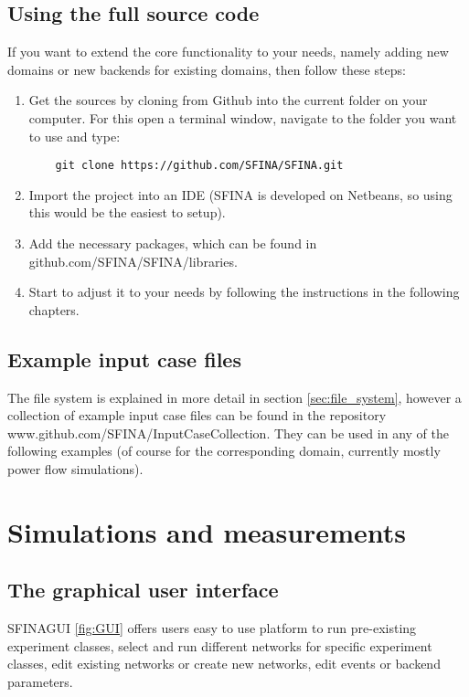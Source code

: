 \documentclass[11pt,fleqn]{book} %
\newcommand{\backend}[1][]{backend#1}
\newcommand{\domain}[1][]{domain#1}
\begin{document}
\subsection{Using the full source code}
If you want to extend the core functionality to your needs, namely adding new \domain{s} or new \backend{s} for existing \domain{s}, then follow these steps:
\begin{enumerate}
	\item Get the sources by cloning from Github into the current folder on your computer. For this open a terminal window, navigate to the folder you want to use and type: 
	\begin{lstlisting}
	git clone https://github.com/SFINA/SFINA.git
	\end{lstlisting}
	\item Import the project into an IDE (SFINA is developed on Netbeans, so using this would be the easiest to setup).
	\item Add the necessary packages, which can be found in github.com/SFINA/SFINA/libraries.
	\item Start to adjust it to your needs by following the instructions in the following chapters.
\end{enumerate}

\subsection{Example input case files}
The file system is explained in more detail in section \ref{sec:file_system}, however a collection of example input case files can be found in the repository www.github.com/SFINA/InputCaseCollection. They can be used in any of the following examples (of course for the corresponding domain, currently mostly power flow simulations).

\section{Simulations and measurements}
\subsection{The graphical user interface}\label{sec:GUI}
SFINAGUI \ref{fig:GUI} offers users easy to use platform to run pre-existing experiment classes, select and run different networks for specific experiment classes, edit existing networks or create new networks, edit events or backend parameters. 
\end{document}
